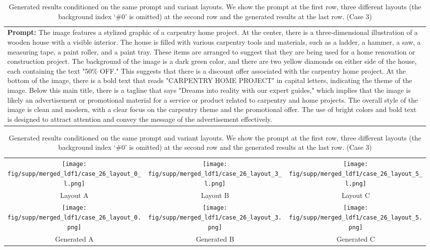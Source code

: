 \begin{table}[htbp]
    \centering
    \begin{tabular}{p{\textwidth}}
    \midrule
    \textbf{Prompt:} \small{The image features a stylized graphic of a carpentry home project. At the center, there is a three-dimensional illustration of a wooden house with a visible interior. The house is filled with various carpentry tools and materials, such as a ladder, a hammer, a saw, a measuring tape, a paint roller, and a paint tray. These items are arranged to suggest that they are being used for a home renovation or construction project. The background of the image is a dark green color, and there are two yellow diamonds on either side of the house, each containing the text "50\% OFF." This suggests that there is a discount offer associated with the carpentry home project. At the bottom of the image, there is a bold text that reads "CARPENTRY HOME PROJECT" in capital letters, indicating the theme of the image. Below this main title, there is a tagline that says "Dreams into reality with our expert guides," which implies that the image is likely an advertisement or promotional material for a service or product related to carpentry and home projects. The overall style of the image is clean and modern, with a clear focus on the carpentry theme and the promotional offer. The use of bright colors and bold text is designed to attract attention and convey the message of the advertisement effectively.}
    \vspace{1em}
    \end{tabular}
    \begin{tabular}{ccc}
        \texttt{[image: fig/supp/merged\_ldf1/case\_26\_layout\_0\_l.png]} &
        \texttt{[image: fig/supp/merged\_ldf1/case\_26\_layout\_3\_l.png]} &
        \texttt{[image: fig/supp/merged\_ldf1/case\_26\_layout\_5\_l.png]} \\
        \small{Layout A} & \small{Layout B} & \small{Layout C} \\[1em]
        \texttt{[image: fig/supp/merged\_ldf1/case\_26\_layout\_0.png]} &
        \texttt{[image: fig/supp/merged\_ldf1/case\_26\_layout\_3.png]} &
        \texttt{[image: fig/supp/merged\_ldf1/case\_26\_layout\_5.png]} \\
        \small{Generated A} & \small{Generated B} & \small{Generated C} \\
        \bottomrule
    \end{tabular}
    
    \caption{Generated results conditioned on the same prompt and variant layouts. We show the prompt at the first row, three different layouts (the background index `\#0' is omitted) at the second row and the generated results at the last row. (Case 3)}
    \label{tab:variant_layout3}
\end{table}


